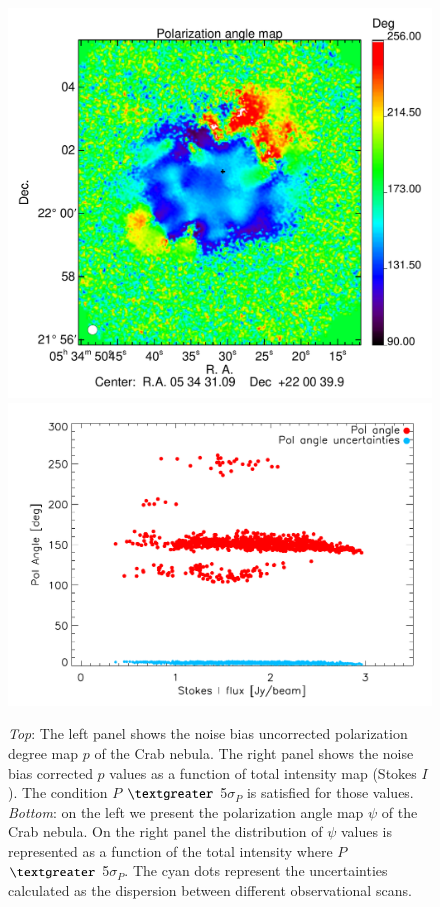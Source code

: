 \documentclass[twocolumn,traditabstract]{aa}
\begin{document}
\begin{figure}
\includegraphics[clip, angle=0, scale = 0.35]{figures/Crab_angle2_2mm.pdf}
\includegraphics[clip, angle=0, scale = 0.5]{figures/pol_angle_vs_I_2mm.pdf}
\caption{{\it Top}: The left panel shows the noise bias uncorrected polarization degree map $p$ of the Crab nebula. The right panel shows the noise bias corrected $p$ values as a function of total intensity map (Stokes $I$). The condition $P$ $\textgreater$ 5$\sigma_{P}$ is satisfied for those values. {\it Bottom}: on the left we present the polarization angle map $\psi$ of the Crab nebula. On the right panel the distribution of $\psi$ values is represented as a function of the total intensity where $P$ $\textgreater$ 5$\sigma_{P}$. The cyan dots represent the uncertainties calculated as the dispersion between different  observational scans.}
\label{fig:pol_degree}
\end{figure}
\end{document}
